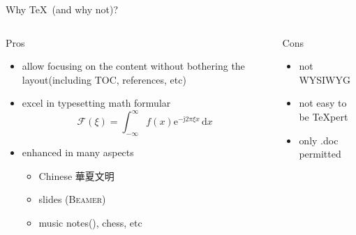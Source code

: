 \documentclass{beamer}
\begin{document}
\begin{frame}{Why \TeX\ (and why not)?}
  \begin{columns}[t]
    \begin{column}{.45\textwidth}
      \begin{block}{Pros}
        \begin{itemize}
          \item allow focusing on the content without bothering the
            layout(including TOC, references, etc)
          \item excel in typesetting math formular
            $$ \mathcal{F}(\xi)=\int_{-\infty}^{\infty}
            f(x)\mathrm{e}^{-\mathrm{j}2\pi \xi x}\,\mathrm{d}x $$
          \item enhanced in many aspects
            \begin{itemize}
              \item Chinese 華夏文明
              \item slides ({\scshape Beamer})
              \item music notes(\twonotes), chess, etc
            \end{itemize}
        \end{itemize}
      \end{block}
    \end{column}

    \begin{column}{.45\textwidth}
      \begin{block}{Cons}
        \begin{itemize}
          \item not WYSIWYG
          \item not easy to be \TeX{}pert
            \bigskip
          \item only .doc permitted
        \end{itemize}
      \end{block}
    \end{column}

  \end{columns}
\end{frame}
\end{document}
